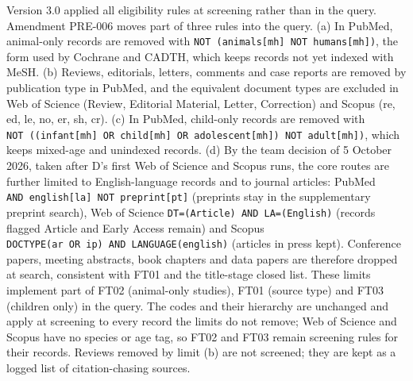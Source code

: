 \documentclass[
  11pt,
  a4paper,
]{article}
\begin{document}
Version 3.0 applied all eligibility rules at screening rather than in
the query. Amendment PRE-006 moves part of three rules into the query.
(a) In PubMed, animal-only records are removed with
\texttt{NOT\ (animals{[}mh{]}\ NOT\ humans{[}mh{]})}, the form used by
Cochrane and CADTH, which keeps records not yet indexed with MeSH. (b)
Reviews, editorials, letters, comments and case reports are removed by
publication type in PubMed, and the equivalent document types are
excluded in Web of Science (Review, Editorial Material, Letter,
Correction) and Scopus (re, ed, le, no, er, sh, cr). (c) In PubMed,
child-only records are removed with
\texttt{NOT\ ((infant{[}mh{]}\ OR\ child{[}mh{]}\ OR\ adolescent{[}mh{]})\ NOT\ adult{[}mh{]})},
which keeps mixed-age and unindexed records. (d) By the team decision of
5 October 2026, taken after D's first Web of Science and Scopus runs,
the core routes are further limited to English-language records and to
journal articles: PubMed
\texttt{AND\ english{[}la{]}\ NOT\ preprint{[}pt{]}} (preprints stay in
the supplementary preprint search), Web of Science
\texttt{DT=(Article)\ AND\ LA=(English)} (records flagged Article and
Early Access remain) and Scopus
\texttt{DOCTYPE(ar\ OR\ ip)\ AND\ LANGUAGE(english)} (articles in press
kept). Conference papers, meeting abstracts, book chapters and data
papers are therefore dropped at search, consistent with FT01 and the
title-stage closed list. These limits implement part of FT02
(animal-only studies), FT01 (source type) and FT03 (children only) in
the query. The codes and their hierarchy are unchanged and apply at
screening to every record the limits do not remove; Web of Science and
Scopus have no species or age tag, so FT02 and FT03 remain screening
rules for their records. Reviews removed by limit (b) are not screened;
they are kept as a logged list of citation-chasing sources.
\end{document}

